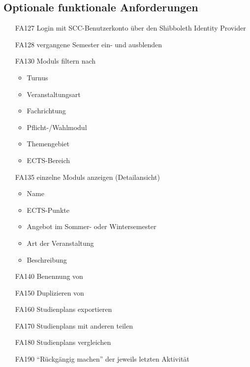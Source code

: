 	\subsection{Optionale funktionale Anforderungen}
		\label{subsec:func_requirements-erweitert}
		\begin{itemize}[nosep]
		\item [FA127] Login mit \gls{SCC}-Benutzerkonto über den \gls{Shibboleth Identity Provider}
		\item [FA128] vergangene Semester ein- und ausblenden
		\item [FA130] \glspl{Modul} filtern nach
		\begin{itemize}
		\item Turnus
		\item Veranstaltungsart
		\item Fachrichtung
		\item Pflicht-/Wahlmodul
		\item Themengebiet
		\item ECTS-Bereich
		\end{itemize}
		\item[FA135] einzelne \glspl{Modul} anzeigen (Detailansicht)
			\begin{itemize}[nosep]
						\item Name
						\item \gls{ECTS-Punkte}
						\item Angebot im Sommer- oder Wintersemester
						\item Art der Veranstaltung	
						\item Beschreibung
					\end{itemize}
		\item [FA140]	Benennung von
		\item [FA150] Duplizieren von 
		\item [FA160] \glspl{Studienplan} exportieren
		\item [FA170] \glspl{Studienplan} mit anderen  teilen
		\item[FA180] \glspl{Studienplan} vergleichen
		\item [FA190] \enquote{Rückgängig machen} der jeweils letzten Aktivität
		\end{itemize}

